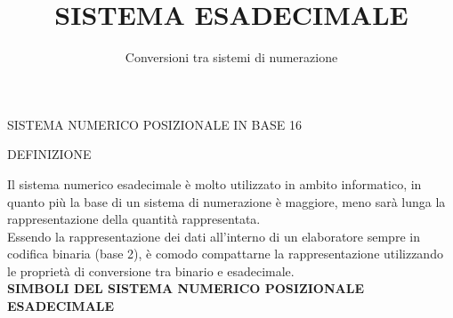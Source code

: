 \documentclass[aspectratio=1610]{beamer}
\title{SISTEMA ESADECIMALE}
\subtitle{Conversioni tra sistemi di numerazione}
\date{}
\institute{}
\begin{document}
\begin{frame}
    \titlepage
\end{frame}

\begin{frame}{SISTEMA NUMERICO POSIZIONALE IN BASE 16}
    \begin{alertblock}{DEFINIZIONE}
        \begin{minipage}{0.98\linewidth}
            \justifying
            Il sistema numerico esadecimale è molto utilizzato in ambito informatico, in quanto 
            più la base di un sistema di numerazione è maggiore, meno sarà lunga la rappresentazione 
            della quantità rappresentata.\\ 
            \pause
            Essendo la rappresentazione dei dati all'interno di un elaboratore sempre in codifica 
            binaria (base 2), è comodo compattarne la rappresentazione utilizzando le proprietà 
            di conversione tra binario e esadecimale.\\
            \bigskip
            \textbf{SIMBOLI DEL SISTEMA NUMERICO POSIZIONALE ESADECIMALE}\\
            \bigskip
        \end{minipage}
    \end{alertblock}
\end{frame}
\end{document}
